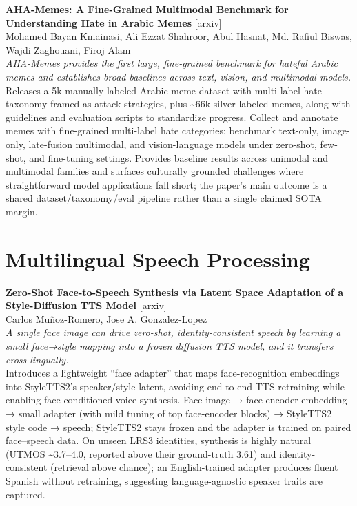 \documentclass[12pt,letterpaper]{article}
\begin{document}
\medskip

{\small\textbf{AHA-Memes: A Fine-Grained Multimodal Benchmark for Understanding Hate in Arabic Memes}} {\scriptsize[\href{https://arxiv.org/abs/2607.27393}{arxiv}]}\\
{\scriptsize Mohamed Bayan Kmainasi, Ali Ezzat Shahroor, Abul Hasnat, Md. Rafiul Biswas, Wajdi Zaghouani, Firoj Alam}\\

{\small\textit{AHA-Memes provides the first large, fine-grained benchmark for hateful Arabic memes and establishes broad baselines across text, vision, and multimodal models.}}\\[1pt]
{\footnotesize Releases a 5k manually labeled Arabic meme dataset with multi-label hate taxonomy framed as attack strategies, plus \textasciitilde{}66k silver-labeled memes, along with guidelines and evaluation scripts to standardize progress. Collect and annotate memes with fine-grained multi-label hate categories; benchmark text-only, image-only, late-fusion multimodal, and vision-language models under zero-shot, few-shot, and fine-tuning settings. Provides baseline results across unimodal and multimodal families and surfaces culturally grounded challenges where straightforward model applications fall short; the paper's main outcome is a shared dataset/taxonomy/eval pipeline rather than a single claimed SOTA margin.}

\medskip


\section*{Multilingual Speech Processing}

{\small\textbf{Zero-Shot Face-to-Speech Synthesis via Latent Space Adaptation of a Style-Diffusion TTS Model}} {\scriptsize[\href{https://arxiv.org/abs/2607.26742}{arxiv}]}\\
{\scriptsize Carlos Mu\~noz-Romero, Jose A. Gonzalez-Lopez}\\

{\small\textit{A single face image can drive zero-shot, identity-consistent speech by learning a small face→style mapping into a frozen diffusion TTS model, and it transfers cross-lingually.}}\\[1pt]
{\footnotesize Introduces a lightweight ``face adapter'' that maps face-recognition embeddings into StyleTTS2's speaker/style latent, avoiding end-to-end TTS retraining while enabling face-conditioned voice synthesis. Face image → face encoder embedding → small adapter (with mild tuning of top face-encoder blocks) → StyleTTS2 style code → speech; StyleTTS2 stays frozen and the adapter is trained on paired face--speech data. On unseen LRS3 identities, synthesis is highly natural (UTMOS \textasciitilde{}3.7--4.0, reported above their ground-truth 3.61) and identity-consistent (retrieval above chance); an English-trained adapter produces fluent Spanish without retraining, suggesting language-agnostic speaker traits are captured.}
\end{document}
